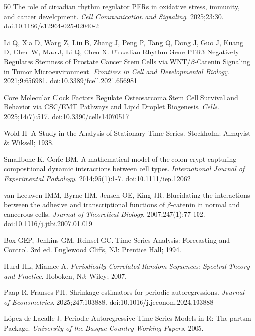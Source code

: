\documentclass[11pt,a4paper]{article}
\begin{document}
\begin{thebibliography}{50}
The role of circadian rhythm regulator PERs in oxidative stress, immunity, and cancer development.
\textit{Cell Communication and Signaling}. 2025;23:30. doi:10.1186/s12964-025-02040-2

Li Q, Xia D, Wang Z, Liu B, Zhang J, Peng P, Tang Q, Dong J, Guo J, Kuang D, Chen W, Mao J, Li Q, Chen X.
Circadian Rhythm Gene PER3 Negatively Regulates Stemness of Prostate Cancer Stem Cells via WNT/$\beta$-Catenin Signaling in Tumor Microenvironment.
\textit{Frontiers in Cell and Developmental Biology}. 2021;9:656981. doi:10.3389/fcell.2021.656981

Core Molecular Clock Factors Regulate Osteosarcoma Stem Cell Survival and Behavior via CSC/EMT Pathways and Lipid Droplet Biogenesis.
\textit{Cells}. 2025;14(7):517. doi:10.3390/cells14070517

Wold H.
A Study in the Analysis of Stationary Time Series.
Stockholm: Almqvist \& Wiksell; 1938.

Smallbone K, Corfe BM.
A mathematical model of the colon crypt capturing compositional dynamic interactions between cell types.
\textit{International Journal of Experimental Pathology}. 2014;95(1):1-7. doi:10.1111/iep.12062

van Leeuwen IMM, Byrne HM, Jensen OE, King JR.
Elucidating the interactions between the adhesive and transcriptional functions of $\beta$-catenin in normal and cancerous cells.
\textit{Journal of Theoretical Biology}. 2007;247(1):77-102. doi:10.1016/j.jtbi.2007.01.019


Box GEP, Jenkins GM, Reinsel GC.
Time Series Analysis: Forecasting and Control. 3rd ed.
Englewood Cliffs, NJ: Prentice Hall; 1994.

Hurd HL, Miamee A.
\textit{Periodically Correlated Random Sequences: Spectral Theory and Practice}.
Hoboken, NJ: Wiley; 2007.

Paap R, Franses PH.
Shrinkage estimators for periodic autoregressions.
\textit{Journal of Econometrics}. 2025;247:103888. doi:10.1016/j.jeconom.2024.103888

L\'opez-de-Lacalle J.
Periodic Autoregressive Time Series Models in R: The partsm Package.
\textit{University of the Basque Country Working Papers}. 2005.


\end{thebibliography}
\end{document}
